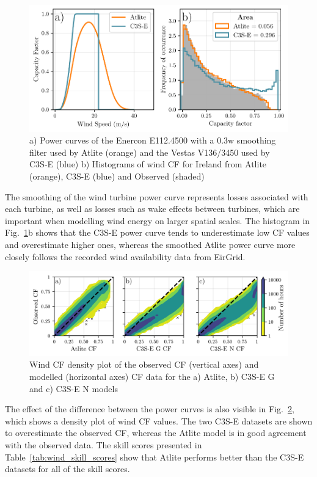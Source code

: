 \documentclass[preprint, 12pt]{elsarticle}
\begin{document}
\begin{figure}[!ht]
	\centering
	\includegraphics[width=\textwidth]{verification_power_curve.pdf}
	\caption{a) Power curves of the Enercon E112.4500 with a 0.3w smoothing filter used by Atlite (orange) and the Vestas V136/3450 used by C3S-E (blue) b) Histograms of wind CF for Ireland from Atlite (orange), C3S-E (blue) and Observed (shaded)}
	\label{fig:power_curve}
\end{figure}

The smoothing of the wind turbine power curve represents losses associated with each turbine, as well as losses such as wake effects between turbines, which are important when modelling wind energy on larger spatial scales. The histogram in Fig.~\ref{fig:power_curve}b shows that the C3S-E power curve tends to underestimate low CF values and overestimate higher ones, whereas the smoothed Atlite power curve more closely follows the recorded wind availability data from EirGrid.

\begin{figure}[!ht]
	\centering
	\includegraphics[width=\textwidth]{verification_wind_contour.png}
	\caption{Wind CF density plot of the observed CF (vertical axes) and modelled (horizontal axes) CF data for the a) Atlite, b) C3S-E G and c) C3S-E N models}
	\label{fig:wind_verification_contour}
\end{figure}

The effect of the difference between the power curves is also visible in Fig.~\ref{fig:wind_verification_contour}, which shows a density plot of wind CF values. The two C3S-E datasets are shown to overestimate the observed CF, whereas the Atlite model is in good agreement with the observed data. The skill scores presented in Table~\ref{tab:wind_skill_scores} show that Atlite performs better than the C3S-E datasets for all of the skill scores. 
\end{document}
